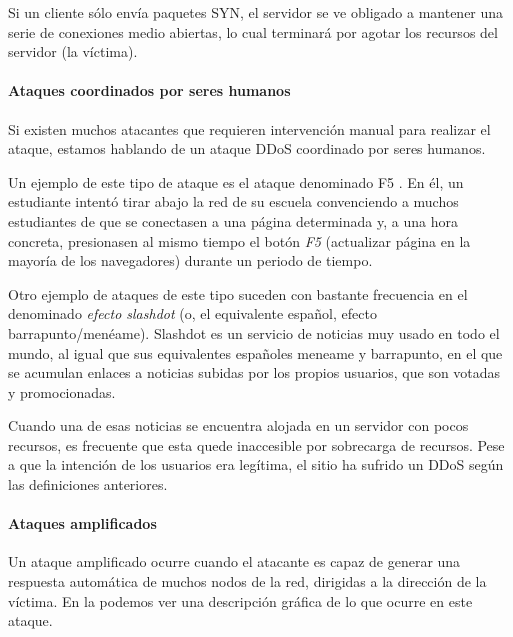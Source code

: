 Si un cliente sólo envía paquetes SYN, el servidor se ve obligado a mantener una serie de conexiones medio abiertas, lo 
cual terminará por agotar los recursos del servidor (la víctima).

\paragraph{Ataques coordinados por seres humanos}\mbox{\newline}

\noindent Si existen muchos atacantes que requieren intervención manual para realizar el ataque, estamos hablando de un 
ataque DDoS coordinado por seres humanos. 

Un ejemplo de este tipo de ataque es el ataque denominado F5 \cite{F5_attack}. En él, un estudiante intentó tirar abajo 
la red de su escuela convenciendo a muchos estudiantes de que se conectasen a una página determinada y, a una hora 
concreta, presionasen al mismo tiempo el botón \emph{F5} (actualizar página en la mayoría de los navegadores) durante 
un periodo de tiempo.

Otro ejemplo de ataques de este tipo suceden con bastante frecuencia en el denominado \emph{efecto slashdot} (o, el 
equivalente español, efecto barrapunto/menéame). Slashdot es un servicio de noticias muy usado en todo el mundo, al 
igual que sus equivalentes españoles meneame y barrapunto, en el que se acumulan enlaces a noticias subidas por los 
propios usuarios, que son votadas y promocionadas.

Cuando una de esas noticias se encuentra alojada en un servidor con pocos recursos, es frecuente que esta quede 
inaccesible por sobrecarga de recursos. Pese a que la intención de los usuarios era legítima, el sitio ha sufrido un 
\gls{DDoS} según las definiciones anteriores.

\paragraph{Ataques amplificados}\mbox{\newline} 

\noindent Un ataque amplificado ocurre cuando el atacante es capaz de generar una respuesta automática de muchos nodos 
de la red, dirigidas a la dirección de la víctima. En la  podemos ver una descripción gráfica de lo 
que ocurre en este ataque.


